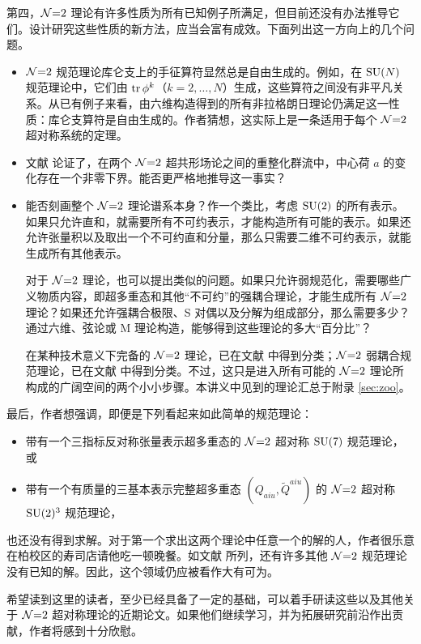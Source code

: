 第四，$\mathcal{N}{=}2$ 理论有许多性质为所有已知例子所满足，但目前还没有办法推导它们。设计研究这些性质的新方法，应当会富有成效。下面列出这一方向上的几个问题。
\begin{itemize}
\item $\mathcal{N}{=}2$ 规范理论库仑支上的手征算符显然总是自由生成的。例如，在 $\mathop{\mathrm{SU}}(N)$ 规范理论中，它们由 $\mathop{\mathrm{tr}}\nolimits\phi^k$（$k=2,\ldots,N$）生成，这些算符之间没有非平凡关系。从已有例子来看，由六维构造得到的所有非拉格朗日理论仍满足这一性质：库仑支算符是自由生成的。作者猜想，这实际上是一条适用于每个 $\mathcal{N}{=}2$ 超对称系统的定理。
\item 文献 \cite{Buican:2013ica} 论证了，在两个 $\mathcal{N}{=}2$ 超共形场论之间的重整化群流中，中心荷 $a$ 的变化存在一个非零下界。能否更严格地推导这一事实？
\item 能否刻画整个 $\mathcal{N}{=}2$ 理论谱系本身？作一个类比，考虑 $\mathop{\mathrm{SU}}(2)$ 的所有表示。如果只允许直和，就需要所有不可约表示，才能构造所有可能的表示。如果还允许张量积以及取出一个不可约直和分量，那么只需要二维不可约表示，就能生成所有其他表示。

对于 $\mathcal{N}{=}2$ 理论，也可以提出类似的问题。如果只允许弱规范化，需要哪些广义物质内容，即超多重态和其他“不可约”的强耦合理论，才能生成所有 $\mathcal{N}{=}2$ 理论？如果还允许强耦合极限、S 对偶以及分解为组成部分，那么需要多少？通过六维、弦论或 M 理论构造，能够得到这些理论的多大“百分比”？

在某种技术意义下完备的 $\mathcal{N}{=}2$ 理论，已在文献 \cite{Cecotti:2011rv} 中得到分类；$\mathcal{N}{=}2$ 弱耦合规范理论，已在文献 \cite{Bhardwaj:2013qia} 中得到分类。不过，这只是进入所有可能的 $\mathcal{N}{=}2$ 理论所构成的广阔空间的两个小小步骤。本讲义中见到的理论汇总于附录 \ref{sec:zoo}。
\end{itemize}

最后，作者想强调，即便是下列看起来如此简单的规范理论：
\begin{itemize}
\item 带有一个三指标反对称张量表示超多重态的 $\mathcal{N}{=}2$ 超对称 $\mathop{\mathrm{SU}}(7)$ 规范理论，或
\item 带有一个有质量的三基本表示完整超多重态 $(Q_{aiu},\tilde Q^{aiu})$ 的 $\mathcal{N}{=}2$ 超对称 $\mathop{\mathrm{SU}}(2)^3$ 规范理论，
\end{itemize}
也还没有得到求解。对于第一个求出这两个理论中任意一个的解的人，作者很乐意在柏校区的寿司店请他吃一顿晚餐。如文献 \cite{Bhardwaj:2013qia} 所列，还有许多其他 $\mathcal{N}{=}2$ 规范理论没有已知的解。因此，这个领域仍应被看作大有可为。

希望读到这里的读者，至少已经具备了一定的基础，可以着手研读这些以及其他关于 $\mathcal{N}{=}2$ 超对称理论的近期论文。如果他们继续学习，并为拓展研究前沿作出贡献，作者将感到十分欣慰。
